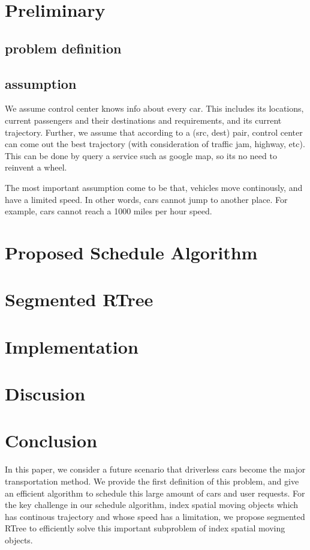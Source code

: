 \documentclass{vldb}
\begin{document}
\section{Preliminary}
\label{preliminary}
\subsection{problem definition}
\subsection{assumption}
We assume control center knows info about every car.
This includes its locations,
current passengers and their destinations and requirements,
and its current trajectory.
Further, we assume that according to a (src, dest) pair,
control center can come out the best trajectory (with consideration of traffic jam, highway, etc).
This can be done by query a service such as google map, so its no need to reinvent a wheel.

The most important assumption come to be that,
vehicles move continously, and have a limited speed.
In other words, cars cannot jump to another place.
For example, cars cannot reach a 1000 miles per hour speed. 

\section{Proposed Schedule Algorithm}
\label{schedule}

\section{Segmented RTree}
\label{segmented_rtree}

\section{Implementation}
\label{implementation}

\section{Discusion}
\label{discussion}

\section{Conclusion}
\label{conclusion}
In this paper, we consider a future scenario that driverless cars become the major transportation method.
We provide the first definition of this problem,
and give an efficient algorithm to schedule this large amount of cars and user requests.
For the key challenge in our schedule algorithm,
index spatial moving objects which has continous trajectory and whose speed has a limitation,
we propose segmented RTree to efficiently solve this important subproblem of index spatial moving objects.
\end{document}
